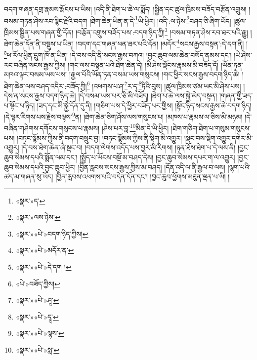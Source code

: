 བདག་གཞན་དགྲ་རྣམས་རྨོངས་པ་ཡིས། །འདི་ནི་ཐེག་པ་ཆེ་ལ་སྨོད། །སྦྱིན་དང་ཚུལ་ཁྲིམས་བཟོད་བརྩོན་འགྲུས། །བསམ་གཏན་ཤེས་རབ་སྙིང་རྗེའི་བདག །ཐེག་ཆེན་ཡིན་ན་དེ་\footnote{«སྣར་»ད་}ཡི་ཕྱིར། །འདི་:ལ་ཉེས་\footnote{«སྣར་»ལས་ཉེས་}བཤད་ཅི་ཞིག་ཡོད། །ཚུལ་ཁྲིམས་སྦྱིན་པས་གཞན་གྱི་དོན། །བརྩོན་འགྲུས་བཟོད་པས་:བདག་ཉིད་ཀྱི།\footnote{«སྣར་»«པེ་»བདག་ཉིད་ཀྱིས།} །བསམ་གཏན་ཤེས་རབ་ཐར་པའི་རྒྱུ། །ཐེག་ཆེན་དོན་ནི་བསྡུས་པ་ཡིན། །བདག་དང་གཞན་ཕན་ཐར་པའི་དོན། །མདོར་\footnote{«སྣར་»«པེ་»མདོར་ན་}སངས་རྒྱས་བསྟན་:དེ་དག་ནི། །\footnote{«སྣར་»«པེ་»དེ་དག །}ཕ་རོལ་ཕྱིན་དྲུག་ཁོ་ན་ཡིན། །དེ་བས་འདི་ནི་སངས་རྒྱས་བཀའ། །བྱང་ཆུབ་ལམ་ཆེན་བསོད་ནམས་དང་། །ཡེ་ཤེས་རང་བཞིན་སངས་རྒྱས་ཀྱིས། །གང་ལས་བསྟན་པའི་ཐེག་ཆེན་དེ། །མི་ཤེས་ལྡོངས་རྣམས་མི་བཟོད་དོ། །ཡོན་ཏན་མཁའ་ལྟར་བསམ་ཡས་པས། །རྒྱལ་པོའི་ཡོན་ཏན་བསམ་ཡས་གསུངས། །གང་ཕྱིར་སངས་རྒྱས་བདག་ཉིད་ཆེ། །ཐེག་ཆེན་ལས་བཤད་འདིར་:བཟོད་ཀྱི།\footnote{«པེ་»བཟོད་ཀྱིས།} །འཕགས་པ་ཤ་\footnote{«སྣར་»«པེ་»ཤཱ་}ར་དྭ་\footnote{«སྣར་»«པེ་»དྭཱ་}ཏིའི་བུས། །ཚུལ་ཁྲིམས་ཙམ་ཡང་མི་ཤེས་པས། །དེས་ན་སངས་རྒྱས་བདག་ཉིད་ཆེ། །དེ་བསམ་ཡས་པར་ཅི་མི་བཟོད། །ཐེག་པ་ཆེ་ལས་སྐྱེ་མེད་བསྟན། །གཞན་གྱི་ཟད་པ་སྟོང་པ་ཉིད། །ཟད་དང་མི་སྐྱེ་དོན་དུ་ནི། །གཅིག་པས་དེ་ཕྱིར་བཟོད་པར་གྱིས། །སྟོང་ཉིད་སངས་རྒྱས་ཆེ་བདག་ཉིད། །དེ་ལྟར་རིགས་པས་རྗེས་བལྟས་\footnote{«སྣར་»«པེ་»ལྷས་}ན། །ཐེག་ཆེན་ཅིག་ཤོས་ལས་གསུངས་པ། །མཁས་པ་རྣམས་ལ་ཅིས་མི་མཉམ། །དེ་བཞིན་གཤེགས་དགོངས་གསུངས་པ་རྣམས། །ཤེས་པར་བླ་\footnote{«སྣར་»«པེ་»སླ་}མིན་དེ་ཡི་ཕྱིར། །ཐེག་གཅིག་ཐེག་པ་གསུམ་གསུངས་པས། །བཏང་སྙོམས་ཀྱིས་ནི་བདག་བསྲུང་བྱ། །བཏང་སྙོམས་ཀྱིས་ནི་སྡིག་མི་འགྱུར། །སྡང་བས་སྡིག་འགྱུར་དགེར་མི་འགྱུར། །དེ་བས་ཐེག་ཆེན་ཞེ་སྡང་བ། །བདག་ལེགས་འདོད་པས་བྱར་མི་རིགས། །ཉན་ཐོས་ཐེག་པ་དེ་ལས་ནི། །བྱང་ཆུབ་སེམས་དཔའི་སྨོན་ལམ་དང་། །སྤྱོད་པ་ཡོངས་བསྔོ་མ་བཤད་དེས། །བྱང་ཆུབ་སེམས་དཔར་ག་ལ་འགྱུར། །བྱང་ཆུབ་སེམས་དཔའི་བྱང་ཆུབ་ཕྱིར། །བྱིན་རླབས་སངས་རྒྱས་ཀྱིས་མ་བཤད། །དོན་འདི་ལ་ནི་རྒྱལ་བ་ལས། །ལྷག་པའི་ཚད་མ་གཞན་སུ་ཡོད། །བྱིན་རླབས་འཕགས་པའི་བདེན་དོན་དང་། །བྱང་ཆུབ་ཕྱོགས་མཐུན་ལྡན་པ་ཡི། །
